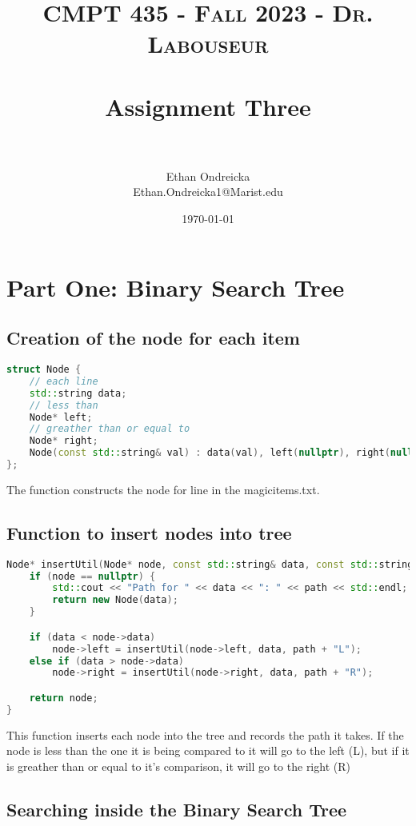 \documentclass[letterpaper, 10pt,DIV=13]{scrartcl}
\title{	
   \normalfont \normalsize 
   \textsc{CMPT 435 - Fall 2023 - Dr. Labouseur} \\[10pt] %
   \horrule{0.5pt} \\[0.25cm] 	%
   \huge Assignment Three  \\     	    %
   \horrule{0.5pt} \\[0.25cm] 	%
}
\author{Ethan Ondreicka \\ \normalsize Ethan.Ondreicka1@Marist.edu}
\date{\normalsize\today} 	%
\numberwithin{equation}{section} %
\numberwithin{figure}{section} %
\numberwithin{table}{section} %
\begin{document}
\maketitle %

\section{Part One: Binary Search Tree}

\subsection{Creation of the node for each item}

\begin{lstlisting}[language=c++, caption= Construction of the Node Constructor]
struct Node {
    // each line
    std::string data;
    // less than
    Node* left;
    // greather than or equal to
    Node* right;
    Node(const std::string& val) : data(val), left(nullptr), right(nullptr) {}
};
\end{lstlisting}
The function constructs the node for line in the magicitems.txt.
\subsection{Function to insert nodes into tree}
\begin{lstlisting}[language=c++, caption= Inserts each node into the tree]
Node* insertUtil(Node* node, const std::string& data, const std::string& path) {
    if (node == nullptr) {
        std::cout << "Path for " << data << ": " << path << std::endl;
        return new Node(data);
    }

    if (data < node->data)
        node->left = insertUtil(node->left, data, path + "L");
    else if (data > node->data)
        node->right = insertUtil(node->right, data, path + "R");

    return node;
}
\end{lstlisting}
This function inserts each node into the tree and records the path it takes. If the node is less than the one it is being compared to it will go to the left (L), but if it is greather than or equal to it's comparison, it will go to the right (R)

\subsection{Searching inside the Binary Search Tree}
\end{document}
